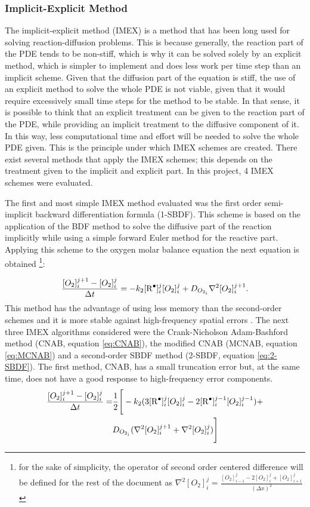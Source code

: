 \begin{refsection}
\subsubsection{Implicit-Explicit Method}
The implicit-explicit method (IMEX) is a method that has been long used for solving reaction-diffusion problems. This is because generally, the reaction part of the PDE tends to be non-stiff, which is why it can be solved solely by an explicit method, which is simpler to implement and does less work per time step than an implicit scheme. Given that the diffusion part of  
the equation is stiff, the use of an explicit method to solve the whole PDE is not viable, given that it would require excessively small time steps for the method to be stable. In that sense, it is possible to think that an explicit treatment can be given to the reaction part of the PDE, while providing an implicit treatment 
to the diffusive component of it. In this way, less computational time and effort will be needed to solve the whole PDE given. This is the principle under which IMEX schemes are created. There exist several  methods that apply the IMEX schemes; this depends on the treatment given to the implicit and explicit part. In this project, 4 IMEX schemes were evaluated.

The first and most simple IMEX method evaluated was the first order semi-implicit backward differentiation formula (1-SBDF). This scheme is based on the application of the BDF method to solve the diffusive part of the reaction implicitly while using a simple forward Euler method  
for the reactive part. Applying this scheme to the oxygen molar balance equation the next equation is obtained \footnote{for the sake of simplicity, the operator of second order centered difference will be  defined for the rest of the document as $\nabla^2 [O_2]^j_i=\frac{[O_2]_{i-1}^{j}-2[O_2]_{i}^{j}+[O_2]_{i+1}^{j}}{(\Delta x)^2}$}:

\begin{equation}
   \frac{[O_2]^{j+1}_i-[O_2]^j_i}{\Delta t}=-k_2[\ce{R^.}]_i^{j}[O_2]_i^{j}+ D_{O_{2_i}}\nabla^2[O_2]_i^{j+1}.
\end{equation}
This method has the advantage of using less memory than the second-order schemes and it is more stable against high-frequency spatial errors \cite{Ruuth1995Implicit-explicitFormation}. The next three IMEX algorithms considered were the Crank-Nicholson Adam-Bashford method (CNAB, equation \ref{eq:CNAB}), the modified CNAB (MCNAB, equation \ref{eq:MCNAB}) and a second-order SBDF method (2-SBDF, equation \ref{eq:2-SBDF}). The first method, CNAB, has a small truncation error but, at the same time, does not have a good response to high-frequency error components.
    \begin{align}
    \frac{[O_2]^{j+1}_i-[O_2]^j_i}{\Delta t}=& \frac{1}{2}\Biggr[-k_2(3[\ce{R^.}]_i^{j}[O_2]_i^{j}-2[\ce{R^.}]_i^{j-1}[O_2]_i^{j-1})+\nonumber\\ &D_{O_{2_i}}(\nabla^2[O_2]_i^{j+1}+\nabla^2[O_2]_i^{j})\Biggr]
    \label{eq:CNAB}
    \end{align}
    

\end{refsection}
